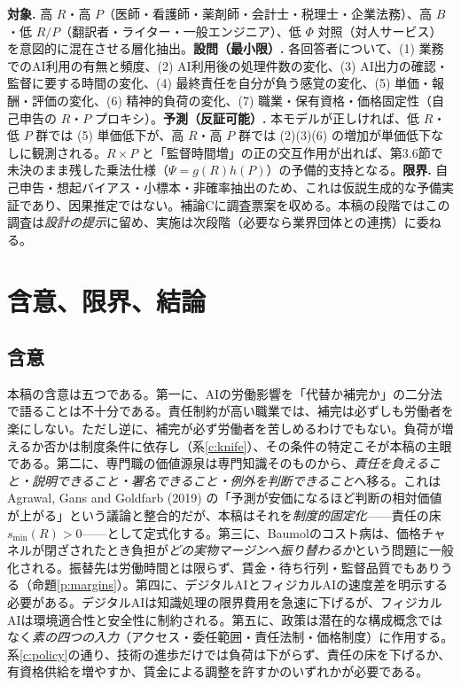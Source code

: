 \documentclass[11pt]{article}
\theoremstyle{plain}
\theoremstyle{definition}
\theoremstyle{remark}
\begin{document}
\textbf{対象.} 高 $R$・高 $P$（医師・看護師・薬剤師・会計士・税理士・企業法務）、高 $B$・低 $R/P$（翻訳者・ライター・一般エンジニア）、低 $\Phi$ 対照（対人サービス）を意図的に混在させる層化抽出。\textbf{設問（最小限）.} 各回答者について、(1) 業務でのAI利用の有無と頻度、(2) AI利用後の処理件数の変化、(3) AI出力の確認・監督に要する時間の変化、(4) 最終責任を自分が負う感覚の変化、(5) 単価・報酬・評価の変化、(6) 精神的負荷の変化、(7) 職業・保有資格・価格固定性（自己申告の $R$・$P$ プロキシ）。\textbf{予測（反証可能）.} 本モデルが正しければ、低 $R$・低 $P$ 群では (5) 単価低下が、高 $R$・高 $P$ 群では (2)(3)(6) の増加が単価低下なしに観測される。$R\times P$ と「監督時間増」の正の交互作用が出れば、第3.6節で未決のまま残した乗法仕様（$\Psi=g(R)h(P)$）の予備的支持となる。\textbf{限界.} 自己申告・想起バイアス・小標本・非確率抽出のため、これは仮説生成的な予備実証であり、因果推定ではない。補論Cに調査票案を収める。本稿の段階ではこの調査は\emph{設計の提示}に留め、実施は次段階（必要なら業界団体との連携）に委ねる。

\section{含意、限界、結論}

\subsection{含意}
本稿の含意は五つである。第一に、AIの労働影響を「代替か補完か」の二分法で語ることは不十分である。責任制約が高い職業では、補完は必ずしも労働者を楽にしない。ただし逆に、補完が必ず労働者を苦しめるわけでもない。負荷が増えるか否かは制度条件に依存し（系\ref{c:knife}）、その条件の特定こそが本稿の主眼である。第二に、専門職の価値源泉は専門知識そのものから、\emph{責任を負えること・説明できること・署名できること・例外を判断できること}へ移る。これは Agrawal, Gans and Goldfarb (2019) の「予測が安価になるほど判断の相対価値が上がる」という議論と整合的だが、本稿はそれを\emph{制度的固定化}——責任の床 $s_{\min}(R)>0$——として定式化する。第三に、Baumolのコスト病は、価格チャネルが閉ざされたとき負担が\emph{どの実物マージンへ振り替わるか}という問題に一般化される。振替先は労働時間とは限らず、賃金・待ち行列・監督品質でもありうる（命題\ref{p:margins}）。第四に、デジタルAIとフィジカルAIの速度差を明示する必要がある。デジタルAIは知識処理の限界費用を急速に下げるが、フィジカルAIは環境適合性と安全性に制約される。第五に、政策は潜在的な構成概念ではなく\emph{素の四つの入力}（アクセス・委任範囲・責任法制・価格制度）に作用する。系\ref{c:policy}の通り、技術の進歩だけでは負荷は下がらず、責任の床を下げるか、有資格供給を増やすか、賃金による調整を許すかのいずれかが必要である。
\end{document}
